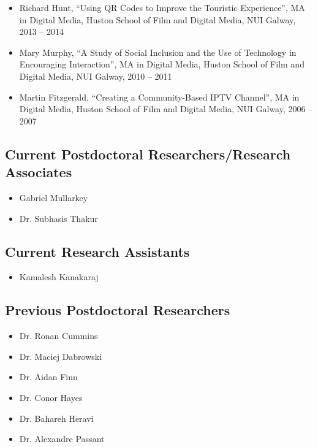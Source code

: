 \documentclass[10pt,a4paper]{res} %
\begin{document}
\begin{resume}
\begin{itemize} \itemsep -2pt
\item Richard Hunt, ``Using QR Codes to Improve the Touristic Experience'', MA in Digital Media, Huston School of Film and Digital Media, NUI Galway, 2013 -- 2014
\item Mary Murphy, ``A Study of Social Inclusion and the Use of Technology in Encouraging Interaction'', MA in Digital Media, Huston School of Film and Digital Media, NUI Galway, 2010 -- 2011
\item Martin Fitzgerald, ``Creating a Community-Based IPTV Channel'', MA in Digital Media, Huston School of Film and Digital Media, NUI Galway, 2006 -- 2007
\end{itemize}

\subsection*{Current Postdoctoral Researchers/Research Associates}

\begin{itemize} \itemsep -2pt
\item Gabriel Mullarkey
\item Dr. Subhasis Thakur
\end{itemize}

\subsection*{Current Research Assistants}

\begin{itemize} \itemsep -2pt
\item Kamalesh Kanakaraj
\end{itemize}

\subsection*{Previous Postdoctoral Researchers}

\begin{itemize} \itemsep -2pt
\item Dr. Ronan Cummins
\item Dr. Maciej Dabrowski
\item Dr. Aidan Finn
\item Dr. Conor Hayes
\item Dr. Bahareh Heravi
\item Dr. Alexandre Passant
\end{itemize}


\end{resume}
\end{document}
